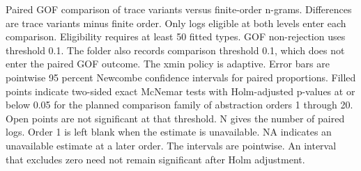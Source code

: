 Paired GOF comparison of trace variants versus finite-order n-grams. Differences are trace variants minus finite order. Only logs eligible at both levels enter each comparison. Eligibility requires at least 50 fitted types. GOF non-rejection uses threshold 0.1. The folder also records comparison threshold 0.1, which does not enter the paired GOF outcome. The xmin policy is adaptive. Error bars are pointwise 95 percent Newcombe confidence intervals for paired proportions. Filled points indicate two-sided exact McNemar tests with Holm-adjusted p-values at or below 0.05 for the planned comparison family of abstraction orders 1 through 20. Open points are not significant at that threshold. N gives the number of paired logs. Order 1 is left blank when the estimate is unavailable. NA indicates an unavailable estimate at a later order. The intervals are pointwise. An interval that excludes zero need not remain significant after Holm adjustment.
